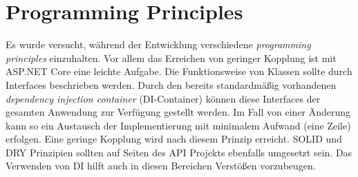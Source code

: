 \part{Programming Principles}
Es wurde versucht, während der Entwicklung
verschiedene \textit{programming principles} einzuhalten.
Vor allem das Erreichen von geringer Kopplung ist mit
ASP.NET Core eine leichte Aufgabe.
Die Funktionsweise von Klassen sollte durch Interfaces beschrieben werden.
Durch den bereits standardmäßig vorhandenen \textit{dependency injection container} (DI-Container)
können diese Interfaces der gesamten Anwendung zur Verfügung gestellt werden.
Im Fall von einer Änderung kann so ein Austausch der
Implementierung mit minimalem Aufwand (eine Zeile) erfolgen.
Eine geringe Kopplung wird nach diesem Prinzip erreicht.
SOLID und DRY Prinzipien sollten auf Seiten des API Projekts ebenfalls umgesetzt sein.
Das Verwenden von DI hilft auch in diesen Bereichen Verstößen vorzubeugen.